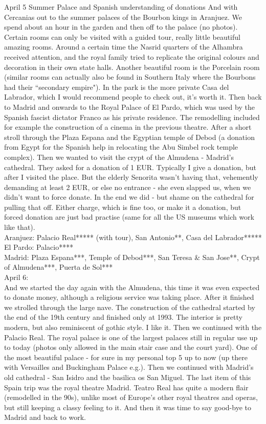 April 5 Summer Palace and Spanish understanding of donations
And with Cercanias out to the summer palaces of the Bourbon kings in Aranjuez. We spend about an hour in the garden and then off to the palace (no photos). Certain rooms can only be visited with a guided tour, really little beautiful amazing rooms. Around a certain time the Nasrid quarters of the Alhambra received attention, and the royal family tried to replicate the original colours and decoration in their own state halls. Another beautiful room is the Porcelain room (similar rooms can actually also be found in Southern Italy where the Bourbons had their ``secondary empire"). In the park is the more private Casa del Labrador, which I would recommend people to check out, it's worth it. Then back to Madrid and onwards to the Royal Palace of El Pardo, which was used by the Spanish fascist dictator Franco as his private residence. The remodelling included for example the construction of a cinema in the previous theatre. After a short stroll through the Plaza Espana and the Egyptian temple of Debod (a donation from Egypt for the Spanish help in relocating the Abu Simbel rock temple complex). Then we wanted to visit the crypt of the Almudena - Madrid's cathedral. They asked for a donation of 1 EUR. Typically I give a donation, but after I visited the place. But the elderly Senorita wasn't having that, vehemently demanding at least 2 EUR, or else no entrance - she even slapped us, when we didn't want to force donate. In the end we did - but shame on the cathedral for pulling that off. Either charge, which is fine too, or make it a donation, but forced donation are just bad practise (same for all the US museums which work like that).\\

Aranjuez:
Palacio Real***** (with tour),
San Antonio**,
Casa del Labrador*****\\
El Pardo: Palacio****\\
Madrid:
Plaza Espana***, 
Temple of Debod***,
San Teresa \& San Jose**,
Crypt of Almudena***,
Puerta de Sol***\\

April 6:\\
And we started the day again with the Almudena, this time it was even expected to donate money, although a religious service was taking place. After it finished we strolled through the large nave. The construction of the cathedral started by the end of the 19th century and finished only at 1993. The interior is pretty modern, but also reminiscent of gothic style. I like it. Then we continued with the Palacio Real. The royal palace is one of the largest palaces still in regular use up to today (photos only allowed in the main stair case and the court yard). One of the most beautiful palace - for sure in my personal top 5 up to now (up there with Versailles and Buckingham Palace e.g.). Then we continued with Madrid's old cathedral - San Isidro and the basilica os San Miguel. The last item of this Spain trip was the royal theatre
Madrid. Teatro Real has quite a modern flair (remodelled in the 90s), unlike most of Europe's other royal theatres and operas, but still keeping a classy feeling to it. And then it was time to say good-bye to Madrid and back to work.\\

